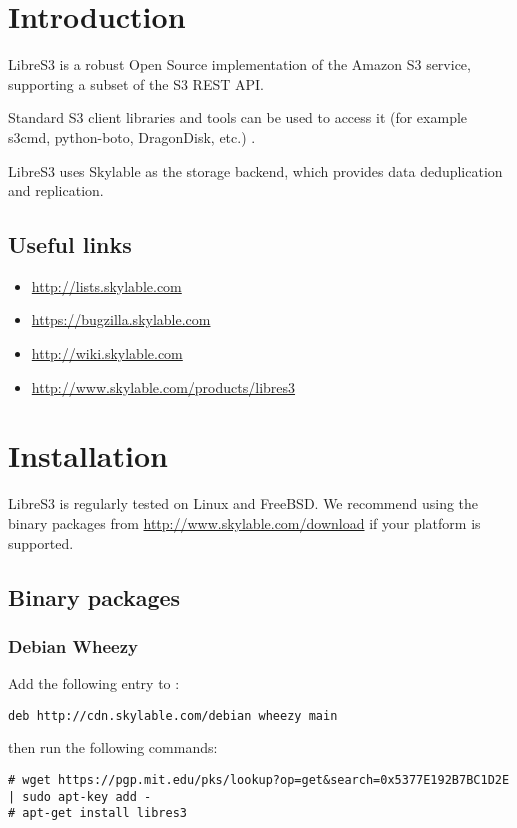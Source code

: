 
\newcommand{\marked}[1]{\color{yellow}\textbf{#1}}
\newcommand{\markedG}[1]{\color{green}\textbf{#1}}
\newcommand{\cmark}{\ding{51}}%
\newcommand{\xmark}{\ding{55}}%

\chapter{Introduction}

\indent LibreS3 is a robust Open Source implementation of the Amazon S3 service,
supporting a subset of the S3 REST API.

Standard S3 client libraries and tools can be used to access it (for example s3cmd, python-boto, DragonDisk, etc.) .

LibreS3 uses Skylable \SX as the storage backend, which provides data
deduplication and replication.

\section{Useful links}
\begin{itemize}
    \item \url{http://lists.skylable.com}
    \item \url{https://bugzilla.skylable.com}
    \item \url{http://wiki.skylable.com}
    \item \url{http://www.skylable.com/products/libres3}
\end{itemize}

\chapter{Installation}

LibreS3 is regularly tested on Linux and FreeBSD. We recommend using the
binary packages from \url{http://www.skylable.com/download} if your platform
is supported.

\section{Binary packages}

\subsection{Debian Wheezy}
Add the following entry to :
\begin{lstlisting}
deb http://cdn.skylable.com/debian wheezy main
\end{lstlisting}
then run the following commands:
\begin{lstlisting}
# wget https://pgp.mit.edu/pks/lookup?op=get&search=0x5377E192B7BC1D2E | sudo apt-key add -
# apt-get install libres3
\end{lstlisting}

